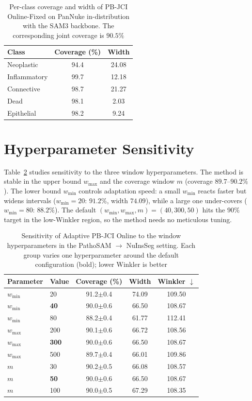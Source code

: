 \documentclass[smallextended,natbib]{svjour3}
\begin{document}
\begin{table}[htbp]
\caption{Per-class coverage and width of PB-JCI Online-Fixed on PanNuke
in-distribution with the SAM3 backbone. The corresponding joint coverage is
$90.5\%$}
\label{tab:perclass}
\centering
\small
\begin{tabular}{@{}lcc@{}}
\toprule
Class & Coverage (\%) & Width \\
\midrule
Neoplastic   & 94.4 & 24.08 \\
Inflammatory & 99.7 & 12.18 \\
Connective   & 98.7 & 21.27 \\
Dead         & 98.1 & 2.03 \\
Epithelial   & 98.2 & 9.24 \\
\bottomrule
\end{tabular}
\end{table}

\section{Hyperparameter Sensitivity}\label{secA:sensitivity}

Table~\ref{tab:sensitivity} studies sensitivity to the three window hyperparameters.
The method is stable in the upper bound $w_{\max}$ and the coverage window $m$
(coverage $89.7$--$90.2\%$). The lower bound $w_{\min}$ controls adaptation speed: a
small $w_{\min}$ reacts faster but widens intervals ($w_{\min}=20$: $91.2\%$, width
$74.09$), while a large one under-covers ($w_{\min}=80$: $88.2\%$). The default
$(w_{\min},w_{\max},m)=(40,300,50)$ hits the $90\%$ target in the low-Winkler region,
so the method needs no meticulous tuning.

\begin{table}[!ht]
\caption{Sensitivity of Adaptive PB-JCI Online to the window hyperparameters in the
PathoSAM $\to$ NuInsSeg setting. Each group varies one hyperparameter around the
default configuration (bold); lower Winkler is better}
\label{tab:sensitivity}
\centering
\small
\begin{tabular}{@{}llccc@{}}
\toprule
Parameter & Value & Coverage (\%) & Width & Winkler $\downarrow$ \\
\midrule
$w_{\min}$ & 20 & 91.2$\pm$0.4 & 74.09 & 109.50 \\
$w_{\min}$ & \textbf{40} & 90.0$\pm$0.6 & 66.50 & 108.67 \\
$w_{\min}$ & 80 & 88.2$\pm$0.4 & 61.77 & 112.41 \\
\midrule
$w_{\max}$ & 200 & 90.1$\pm$0.6 & 66.72 & 108.56 \\
$w_{\max}$ & \textbf{300} & 90.0$\pm$0.6 & 66.50 & 108.67 \\
$w_{\max}$ & 500 & 89.7$\pm$0.4 & 66.01 & 109.86 \\
\midrule
$m$ & 30 & 90.2$\pm$0.5 & 66.08 & 108.57 \\
$m$ & \textbf{50} & 90.0$\pm$0.6 & 66.50 & 108.67 \\
$m$ & 100 & 90.0$\pm$0.5 & 67.29 & 108.35 \\
\bottomrule
\end{tabular}
\end{table}

\FloatBarrier


\end{document}
